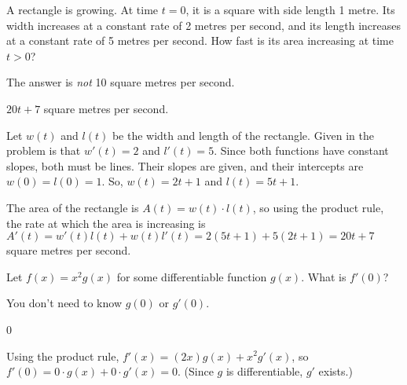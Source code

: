 \begin{Mquestion}
A rectangle is growing. At time $t=0$, it is a square with
           side length 1 metre. Its width increases at a constant rate
           of 2 metres per second, and its length increases at a constant
           rate of 5 metres per second. How fast is its area increasing
           at time $t>0$?\end{Mquestion}
\begin{hint} The answer is \emph{not} 10 square metres per second.
\end{hint}
\begin{answer} $20t+7$ square metres per second.
\end{answer}
\begin{solution} Let $w(t)$ and $l(t)$ be the width and length of the rectangle. Given in the problem is that $w'(t)=2$ and $l'(t)=5$. Since both functions have constant slopes, both must be lines. Their slopes are given, and their intercepts are $w(0)=l(0)=1$. So, $w(t)=2t+1$ and $l(t)=5t+1$.

The area of the rectangle is $A(t)=w(t)\cdot l(t)$, so using the product rule, the rate at which the area is increasing is $A'(t)=w'(t)l(t)+w(t)l'(t)=2(5t+1)+5(2t+1)=20t+7$ square metres per second.
\end{solution}



\begin{question}Let $f(x)=x^2g(x)$ for some differentiable function $g(x)$. What is $ f'(0)$?
\end{question}
\begin{hint} You don't need to know $g(0)$ or $g'(0)$.
\end{hint}
\begin{answer} 0
\end{answer}
\begin{solution}
Using the product rule, $f'(x)=(2x)g(x)+x^2g'(x)$, so $f'(0)=0\cdot g(x)+0\cdot g'(x)=0$. (Since $g$ is differentiable, $g'$ exists.)
\end{solution}



